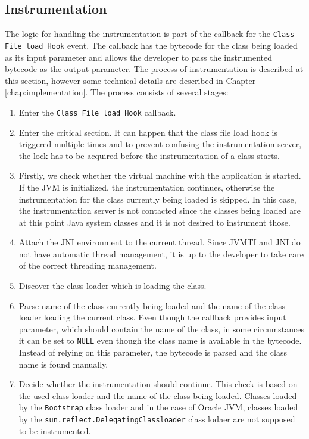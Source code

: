 \subsection{Instrumentation}
The logic for handling the instrumentation is part of the callback for the \texttt{Class File load Hook} event. The callback has the bytecode for the class being loaded as its input parameter and allows the developer to pass the instrumented bytecode as the output parameter. The process of instrumentation is described at this section, however some technical details are described in Chapter \ref{chap:implementation}. The process consists of several stages:
\begin{enumerate}
	\item Enter the \texttt{Class File load Hook} callback.
	\item Enter the critical section. It can happen that the class file load hook is triggered multiple times and to prevent confusing the instrumentation server, the lock has to be acquired before the instrumentation of a class starts.
	\item Firstly, we check whether the virtual machine with the application is \linebreak started. If the JVM is initialized, the instrumentation continues, otherwise the instrumentation for the class currently being loaded is skipped. In this case, the instrumentation server is not contacted since the classes being loaded are at this point Java system classes and it is not desired to instrument those.
	\item Attach the JNI environment to the current thread. Since JVMTI and JNI do not have automatic thread management, it is up to the developer to take care of the correct threading management.
	\item Discover the class loader which is loading the class.
	\item Parse name of the class currently being loaded and the name of the class loader loading the current class. Even though the callback provides input parameter, which should contain the name of the class, in some circumstances it can be set to \texttt{NULL} even though the class name is available in the bytecode. Instead of relying on this parameter, the bytecode is parsed and the class name is found manually.
	\item Decide whether the instrumentation should continue. This check is based on the used class loader and the name of the class being loaded. Classes loaded by the \texttt{Bootstrap} class loader and in the case of Oracle JVM, classes loaded by the \texttt{sun.reflect.DelegatingClassloader} class lodaer are not supposed to be instrumented. 

\end{enumerate}
